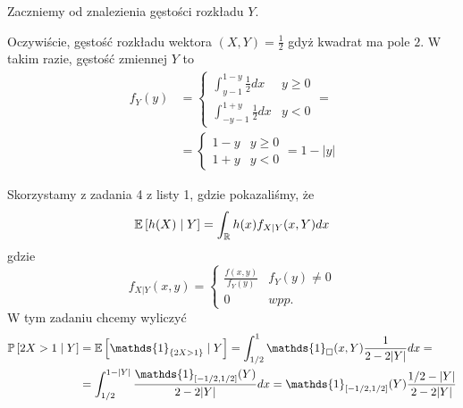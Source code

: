 \begin{solution}
  Zaczniemy od znalezienia gęstości rozkładu $Y$.


  Oczywiście, gęstość rozkładu wektora $(X, Y)=\frac{1}{2}$ gdyż kwadrat ma pole $2$. W takim razie, gęstość zmiennej $Y$ to 
  \begin{align*}
    f_Y(y)&=\begin{cases}\int_{y-1}^{1-y}\frac{1}{2}dx  & y \geq 0\\ \int^{1+y}_{-y-1}\frac{1}{2}dx & y<0\end{cases}=\\ 
          &= \begin{cases}1-y & y\geq 0\\ 1+y&y<0\end{cases}=1-|y|
  \end{align*}

  Skorzystamy z zadania 4 z listy 1, gdzie pokazaliśmy, że 
  $$\expected{h(X)}{Y}=\int_{\R}h(x)f_{X|Y}(x, Y)dx$$
  gdzie 
  $$f_{X|Y}(x, y)=\begin{cases}\frac{f(x, y)}{f_Y(y)}&f_Y(y)\neq 0\\0&wpp.\end{cases}$$
  W tym zadaniu chcemy wyliczyć
  \begin{align*}
    \prob{2X>1}{Y}&=\expected{\mathds{1}_{\{2X>1\}}}{Y}=\int_{1/2}^1\mathds{1}_{\square}(x, Y)\frac{1}{2-2|Y|}dx=\\ 
                  &=\int_{1/2}^{1-|Y|} \frac{ \mathds{1}_{[-1/2,1/2]}(Y) }{2-2|Y|}dx=\mathds{1}_{[-1/2, 1/2]}(Y)\frac{1/2-|Y|}{2-2|Y|}
  \end{align*}




\end{solution}
